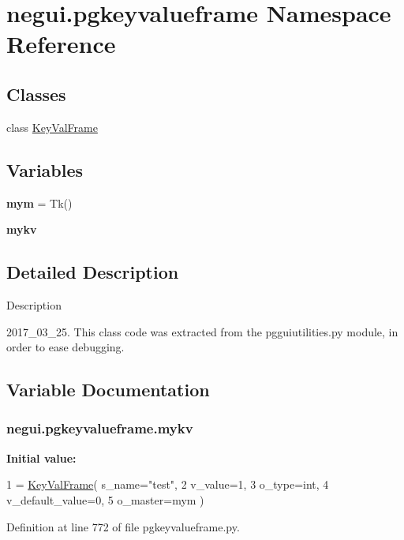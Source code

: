 \hypertarget{namespacenegui_1_1pgkeyvalueframe}{}\section{negui.\+pgkeyvalueframe Namespace Reference}
\label{namespacenegui_1_1pgkeyvalueframe}
\subsection*{Classes}
\begin{DoxyCompactItemize}
\item 
class \hyperlink{classnegui_1_1pgkeyvalueframe_1_1KeyValFrame}{Key\+Val\+Frame}
\end{DoxyCompactItemize}
\subsection*{Variables}
\begin{DoxyCompactItemize}
\item 
{\bfseries mym} = Tk()\hypertarget{namespacenegui_1_1pgkeyvalueframe_a6cba573eb6b29e7bd3a2b732d77dc4b7}{}\label{namespacenegui_1_1pgkeyvalueframe_a6cba573eb6b29e7bd3a2b732d77dc4b7}

\item 
{\bfseries mykv}
\end{DoxyCompactItemize}


\subsection{Detailed Description}
\begin{DoxyVerb}Description

2017_03_25.  This class code was extracted from the 
pgguiutilities.py module, in order to ease debugging.
\end{DoxyVerb}
 

\subsection{Variable Documentation}
\subsubsection[{\texorpdfstring{mykv}{mykv}}]{\setlength{\rightskip}{0pt plus 5cm}negui.\+pgkeyvalueframe.\+mykv}\hypertarget{namespacenegui_1_1pgkeyvalueframe_a53293854ec1a0d16ff6edfbb7f3a2619}{}\label{namespacenegui_1_1pgkeyvalueframe_a53293854ec1a0d16ff6edfbb7f3a2619}
{\bfseries Initial value\+:}
\begin{DoxyCode}
1 = \hyperlink{classnegui_1_1pgkeyvalueframe_1_1KeyValFrame}{KeyValFrame}( s\_name=\textcolor{stringliteral}{"test"}, 
2                         v\_value=1, 
3                         o\_type=int,
4                         v\_default\_value=0,
5                         o\_master=mym )
\end{DoxyCode}


Definition at line 772 of file pgkeyvalueframe.\+py.

